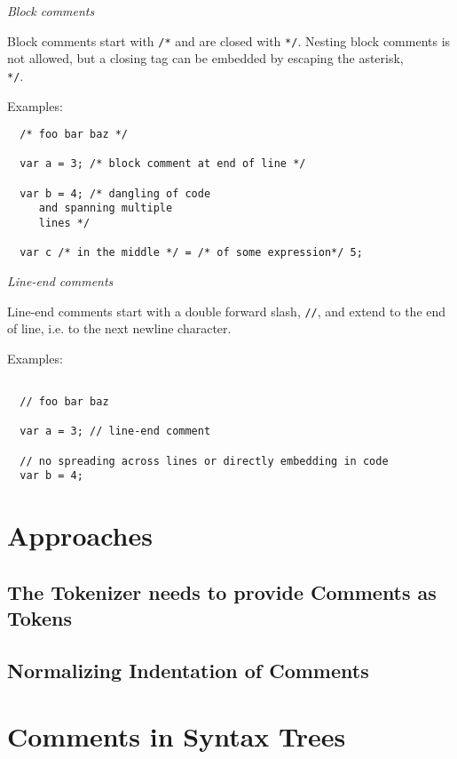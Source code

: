 \documentclass[11pt,a4paper]{article}
\begin{document}
\textit{Block comments}

Block comments start with \texttt{/*} and are closed with \texttt{*/}. Nesting
block comments is not allowed, but a closing tag can be embedded by escaping the
asterisk, \texttt{\\*/}.

Examples:

\begin{verbatim}
  /* foo bar baz */

  var a = 3; /* block comment at end of line */

  var b = 4; /* dangling of code
     and spanning multiple
     lines */

  var c /* in the middle */ = /* of some expression*/ 5;

\end{verbatim}

\textit{Line-end comments}

Line-end comments start with a double forward slash, \texttt{//}, and extend to
the end of line, i.e. to the next newline character.

Examples:

\begin{verbatim}

  // foo bar baz
  
  var a = 3; // line-end comment

  // no spreading across lines or directly embedding in code
  var b = 4;

\end{verbatim}

\section{Approaches}

\subsection{The Tokenizer needs to provide Comments as Tokens}

\subsection{Normalizing Indentation of Comments}


\section{Comments in Syntax Trees}
\end{document}
